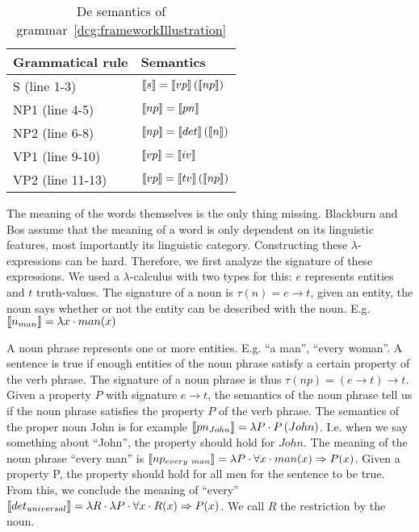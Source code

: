 \begin{table}[h]
  \begin{tabular}{@{}ll}
    \hline
    \textbf{Grammatical rule} & \textbf{Semantics} \\
    \hline
    S (line 1-3) & $\llbracket s \rrbracket = \llbracket vp \rrbracket \left( \llbracket np \rrbracket \right)$ \\
    NP1 (line 4-5) & $\llbracket np \rrbracket = \llbracket pn \rrbracket$ \\
    NP2 (line 6-8) & $\llbracket np \rrbracket = \llbracket det \rrbracket \left( \llbracket n \rrbracket \right)$ \\
    VP1 (line 9-10) & $\llbracket vp \rrbracket = \llbracket iv \rrbracket$ \\
    VP2 (line 11-13) & $\llbracket vp \rrbracket = \llbracket tv \rrbracket \left( \llbracket np \rrbracket \right)$\\
    \hline
  \end{tabular}
  \centering
  \caption{De semantics of grammar~\ref{dcg:frameworkIllustration}}
  \label{tbl:grammar-sem}
\end{table}

The meaning of the words themselves is the only thing missing. Blackburn and Bos assume that the meaning of a word is only dependent on its linguistic features, most importantly its linguistic category. Constructing these $\lambda$-expressions can be hard. Therefore, we first analyze the signature of these expressions. We used a $\lambda$-calculus with two types for this: $e$ represents entities and $t$ truth-values. The signature of a noun is $\tau(n) = e \rightarrow t$, given an entity, the noun says whether or not the entity can be described with the noun. E.g. $\llbracket n_{man} \rrbracket = \lambda x \cdot man(x)$

A noun phrase represents one or more entities. E.g. ``a man'', ``every woman''. A sentence is true if enough entities of the noun phrase satisfy a certain property of the verb phrase. The signature of a noun phrase is thus $\tau(np) = (e \rightarrow t) \rightarrow t$. Given a property $P$ with signature $e \rightarrow t$, the semantics of the noun phrase tell us if the noun phrase satisfies the property $P$ of the verb phrase. The semantics of the proper noun John is for example $\llbracket pn_{John} \rrbracket = \lambda P \cdot P \left( John \right)$. I.e. when we say something about ``John'', the property should hold for $John$. The meaning of the noun phrase ``every man'' is $\llbracket np_{every\ man} \rrbracket = \lambda P \cdot \forall x \cdot man(x) \Rightarrow P(x)$. Given a property P, the property should hold for all men for the sentence to be true. From this, we conclude the meaning of ``every'' $\llbracket det_{universal} \rrbracket = \lambda R \cdot \lambda P \cdot \forall x \cdot R(x) \Rightarrow P(x)$. We call $R$ the restriction by the noun.

